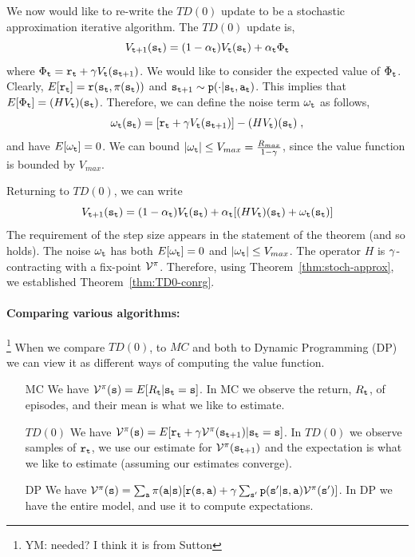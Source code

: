 We now would like to re-write the $TD(0)$ update to be a stochastic
approximation iterative algorithm. The $TD(0)$ update is,
\[
V_{{\tt t}+1}({\tt s}_{\tt t})=(1-\alpha_{\tt t})V_{\tt t}({\tt s}_{\tt t})+\alpha_{\tt t}
\Phi_{\tt t}
\]
where $\Phi_{\tt t}={\tt r}_{\tt t}+\gamma
V_{\tt t}({\tt s}_{{\tt t}+1})$. We would like to consider the expected
value of $\Phi_{\tt t}$. Clearly,
$E[{\tt r}_{\tt t}]={\tt r}({\tt s}_{\tt t},\pi({\tt s}_{\tt t}))$
and ${\tt s}_{{\tt t}+1} \sim {\tt p}(\cdot |{\tt s}_{\tt t},{\tt a}_{\tt t})$.
This implies that $E[\Phi_{\tt t}]=(HV_{\tt t})({\tt s}_{\tt t})$.
Therefore, we can define the noise term $\omega_{\tt t}$ as follows,
\[
\omega_{\tt t}({\tt s}_{\tt t})=[{\tt r}_{\tt t}+\gamma
V_{\tt t}({\tt s}_{{\tt t}+1})]-(HV_{\tt t})({\tt s}_{\tt t})\;,
\]
and have $E[\omega_{\tt t}]=0$. We can bound $|\omega_{\tt t}|\leq
V_{max}=\frac{R_{max}}{1-\gamma}$, since the value function is
bounded by $V_{max}$.

Returning to $TD(0)$, we can write
\[
V_{{\tt t}+1}({\tt s}_{\tt t})=(1-\alpha_{\tt t})V_{\tt t}({\tt s}_{\tt t})+\alpha_{\tt t}
[(HV_{\tt t})({\tt s}_{\tt t})+\omega_{\tt t}({\tt s}_{\tt t})]
\]
The requirement of the step size appears in the statement of the
theorem (and so holds). The noise $\omega_{\tt t}$ has both
$E[\omega_{\tt t}]=0$ and $|\omega_{\tt t}|\leq V_{max}$. The
operator $H$ is $\gamma$-contracting with a fix-point $\mathcal{V}^\pi$.
Therefore, using Theorem~\ref{thm:stoch-approx}, we established
Theorem~\ref{thm:TD0-conrg}.

\paragraph{Comparing various algorithms:}\footnote{YM: needed? I think it is from Sutton}
When we compare $TD(0)$, to $MC$ and both to  Dynamic Programming
(DP) we can view it as different ways of computing the value
function.
\begin{itemize}
\item[MC] We have $\mathcal{V}^\pi({\tt s})=E[R_{\tt t}|{\tt s}_{\tt t}={\tt s}]$. In MC we observe the
return, $R_{\tt t}$, of episodes, and their mean is what we like to
estimate.
\item [$TD(0)$]  We have $\mathcal{V}^\pi({\tt s})=E[{\tt r}_{\tt t}+\gamma \mathcal{V}^\pi({\tt s}_{{\tt t}+1})|{\tt s}_{\tt t}={\tt s}]$. In $TD(0)$ we observe samples of
${\tt r}_{\tt t}$, we use our estimate for
$\mathcal{V}^\pi({\tt s}_{{\tt t}+1})$ and the expectation is what we
like to estimate (assuming our estimates converge).
\item
[DP]
 We have $\mathcal{V}^\pi({\tt s})=\sum_{{\tt a}}\pi({\tt a}|{\tt s})[{\tt r}({\tt s},{\tt a})+\gamma \sum_{{\tt s}'}{\tt p}({\tt s}'|{\tt s},{\tt a})\mathcal{V}^\pi({\tt s}')]$. In DP we
 have the entire model, and use it to compute expectations.
\end{itemize}

